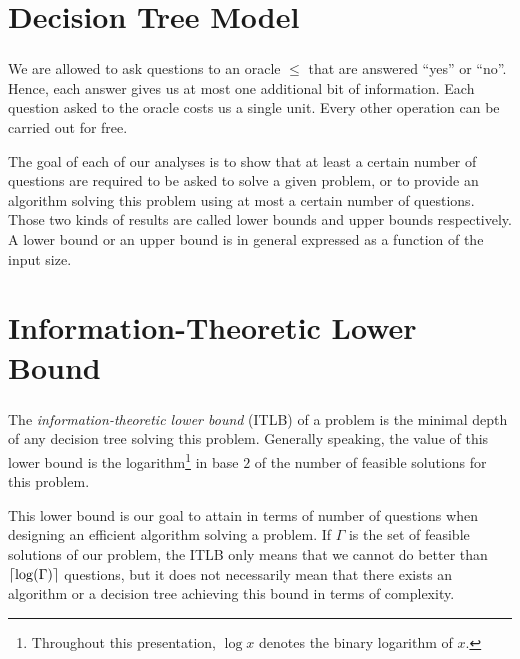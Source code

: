 \documentclass[10pt,xcolor=x11names,dvipsnames,hyperref={colorlinks=false,breaklinks=true,bookmarks=true}]{beamer}
\begin{document}
\section{Decision Tree Model}
\begin{frame}\frametitle{\insertsection}\justifying
\begin{defn}
We are allowed to ask questions to an oracle \(\le\) that are answered
``yes'' or ``no''. Hence, each answer gives us at most
one additional bit of information.
Each question asked to the oracle costs us a single unit.
Every other operation can be carried out for free.
\end{defn}\pause
The goal of each of our analyses is to show that at least a certain
number of questions are required to be asked to solve a given problem, or
to provide an algorithm solving this problem using at most a certain number of
questions. Those two kinds of results are called lower bounds and upper bounds
respectively. A lower bound or an upper bound is in general expressed as
a function of the input size.
\end{frame}

\section{Information-Theoretic Lower Bound}
\begin{frame}\frametitle{\insertsection}\justifying
\begin{defn}
The \emph{information-theoretic lower bound} (\textsc{ITLB}) of a problem
is the minimal depth of any
decision tree solving this problem. Generally speaking, the value of this lower
bound is the logarithm\footnote{Throughout this presentation, \(\log x\) denotes the binary logarithm of \(x\).}
in base \(2\) of the number of feasible solutions for this problem.
\end{defn}\pause
This lower bound is our goal to attain in terms of number of questions
when designing an efficient algorithm solving a problem. If \(\Gamma\) is the
set of feasible solutions of our problem, the \textsc{ITLB} only means
that we cannot do better than \(\lceil\log(\Gamma)\rceil\) questions, but it does not
necessarily mean that there exists an algorithm or a decision tree achieving
this bound in terms of complexity.
\end{frame}
\end{document}
